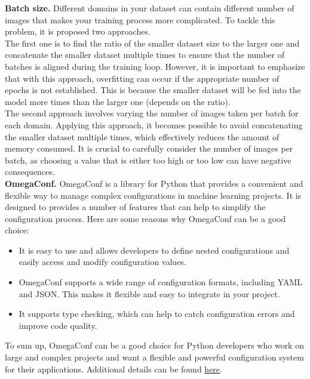 \textbf{Batch size.} Different domains in your dataset can contain different number of images that makes your training process more complicated. To tackle this problem, it is proposed two approaches. \\

The first one is to find the ratio of the smaller dataset size to the larger one and concatenate the smaller dataset multiple times to ensure that the number of batches is aligned during the training loop. However, it is important to emphasize that with this approach, overfitting can occur if the appropriate number of epochs is not established. This is because the smaller dataset will be fed into the model more times than the larger one (depends on the ratio).\\

The second approach involves varying the number of images taken per batch for each domain. Applying this approach, it becomes possible to avoid concatenating the smaller dataset multiple times, which effectively reduces the amount of memory consumed. It is crucial to carefully consider the number of images per batch, as choosing a value that is either too high or too low can have negative consequences.\\

\textbf{OmegaConf.} OmegaConf is a library for Python that provides a convenient and flexible way to manage complex configurations in machine learning projects. It is designed to provides a number of features that can help to simplify the configuration process. Here are some reasons why OmegaConf can be a good choice:

\begin{itemize}
    \item It is easy to use and allows developers to define nested configurations and easily access and modify configuration values.
    \item OmegaConf supports a wide range of configuration formats, including YAML and JSON. This makes it flexible and easy to integrate in your project.
    \item It supports type checking, which can help to catch configuration errors and improve code quality.
\end{itemize}
 
To sum up, OmegaConf can be a good choice for Python developers who work on large and complex projects and want a flexible and powerful configuration system for their applications. Additional details can be found \href{https://omegaconf.readthedocs.io/en/2.3_branch/}{here}.

